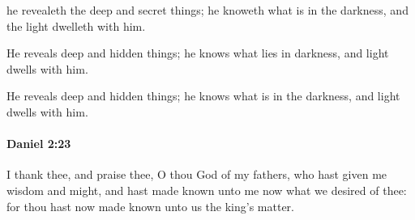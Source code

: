 			\begin{versebox}
					\item[BHS] 
					\item[LXX] 
					\item[ASV] he revealeth the deep and secret things; he knoweth what is in the darkness, and the light dwelleth with him.
					\item[NIV] He reveals deep and hidden things; he knows what lies in darkness, and light dwells with him.
					\item[NRSV] He reveals deep and hidden things; he knows what is in the darkness, and light dwells with him.
			\end{versebox}

		\paragraph{Daniel 2:23} %
			\label{DANIEL-2-23}

			I thank thee, and praise thee, O thou God of my fathers, who hast given me wisdom and might, and hast made known unto me now what we desired of thee: for thou hast now made known unto us the king’s matter.

